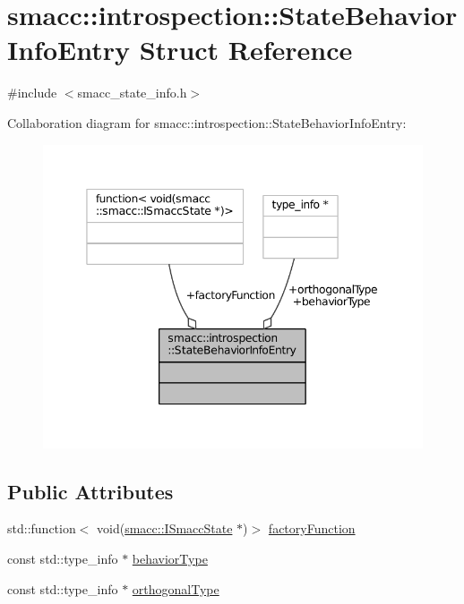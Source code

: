 \hypertarget{structsmacc_1_1introspection_1_1StateBehaviorInfoEntry}{}\section{smacc\+:\+:introspection\+:\+:State\+Behavior\+Info\+Entry Struct Reference}
\label{structsmacc_1_1introspection_1_1StateBehaviorInfoEntry}


{\ttfamily \#include $<$smacc\+\_\+state\+\_\+info.\+h$>$}



Collaboration diagram for smacc\+:\+:introspection\+:\+:State\+Behavior\+Info\+Entry\+:
\nopagebreak
\begin{figure}[H]
\begin{center}
\leavevmode
\includegraphics[width=345pt]{structsmacc_1_1introspection_1_1StateBehaviorInfoEntry__coll__graph}
\end{center}
\end{figure}
\subsection*{Public Attributes}
\begin{DoxyCompactItemize}
\item 
std\+::function$<$ void(\hyperlink{classsmacc_1_1ISmaccState}{smacc\+::\+I\+Smacc\+State} $\ast$)$>$ \hyperlink{structsmacc_1_1introspection_1_1StateBehaviorInfoEntry_ac7db4e9a687700edb0207ee100aa3576}{factory\+Function}
\item 
const std\+::type\+\_\+info $\ast$ \hyperlink{structsmacc_1_1introspection_1_1StateBehaviorInfoEntry_a7817d4924f26f4ef16dfdcf40b78b337}{behavior\+Type}
\item 
const std\+::type\+\_\+info $\ast$ \hyperlink{structsmacc_1_1introspection_1_1StateBehaviorInfoEntry_aafb02bbfd8a479d586039b3971dfe7e0}{orthogonal\+Type}
\end{DoxyCompactItemize}


